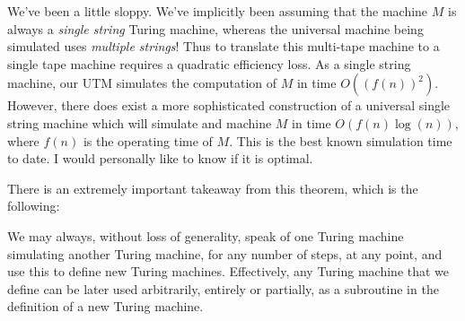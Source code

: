 \documentclass{article}
\theoremstyle{definition}
\theoremstyle{plain}
\theoremstyle{theorem}
\begin{document}
\par We've been a little sloppy. We've implicitly been assuming that the machine $M$ is always a \textit{single string} Turing machine, whereas the universal machine being simulated uses \textit{multiple strings}! Thus to translate this multi-tape machine to a single tape machine requires a quadratic efficiency loss. As a single string machine, our UTM simulates the computation of $M$ in time $O((f(n))^2)$. However, there does exist a more sophisticated construction of a universal single string machine which will simulate and machine $M$ in time $O(f(n)\log(n))$, where $f(n)$ is the operating time of $M$. This is the best known simulation time to date. I would personally like to know if it is optimal. \par 
There is an extremely important takeaway from this theorem, which is the following:
\begin{center}
    We may always, without loss of generality, speak of one Turing machine simulating another Turing machine, for any number of steps, at any point, and use this to define new Turing machines. Effectively, any Turing machine that we define can be later used arbitrarily, entirely or partially, as a subroutine in the definition of a new Turing machine.
\end{center}
\end{document}
